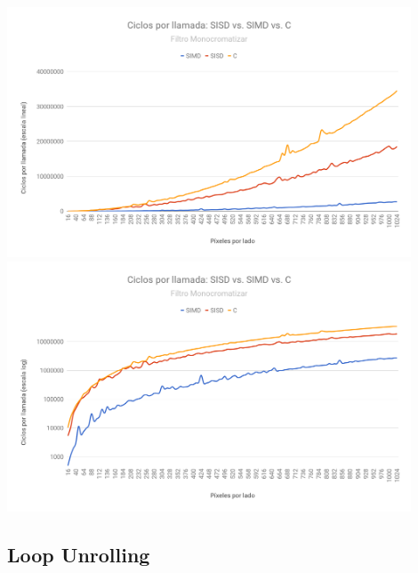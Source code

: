 \begin{center}

	\includegraphics[width=0.9\textwidth]{imagenes/simdsisd/SIMDvsSISDvsClin.png} \\
	\includegraphics[width=0.9\textwidth]{imagenes/simdsisd/SIMDvsSISDvsClog.png}

\end{center}

\subsection{Loop Unrolling}

